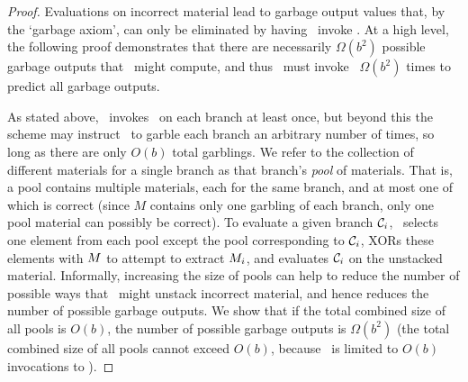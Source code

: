 \begin{proof}
Evaluations on incorrect material lead to garbage output values that,
by the `garbage axiom', can only be eliminated by having \Gen\ invoke
\Ev.
At a high level, the following proof demonstrates that there are
necessarily $\Omega(b^2)$ possible garbage outputs that \Eval\ might
compute, and thus \Gen\ must invoke \Ev\ $\Omega(b^2)$ times to
predict all garbage outputs.

As stated above, \Eval\ invokes \Gb\ on each branch at least once, but beyond this the
scheme may instruct \Eval\ to garble each branch an arbitrary number of
times, so long as there are only $O(b)$ total garblings.
%
We refer to the collection of different materials for a single branch
as that branch's \emph{pool} of materials.
That is, a pool contains multiple materials, each for the same branch,
and at most one of which is correct (since $M$ contains only one
garbling of each branch, only one pool material can possibly be
correct).
%
To evaluate a given branch $\mathcal C_i$, \Eval\ selects one element from
each pool except the pool corresponding to $\mathcal C_i$, XORs these
elements with $M$ to attempt to extract $M_i$, and evaluates
$\mathcal C_i$ on the unstacked material.
%
Informally, increasing the size of pools can help to reduce
the number of possible ways that \Eval\ might unstack incorrect
material, and hence reduces the number of possible garbage outputs.
%
We show that if the total combined size of all pools
is $O(b)$, the number of possible garbage outputs is $\Omega(b^2)$
(the total combined size of all pools cannot exceed $O(b)$,
because \Eval\ is limited to $O(b)$ invocations to \Gb).



\end{proof}
